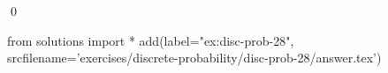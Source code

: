 
\begin{ex} 
  \label{ex:disc-prob-28}
  
  \qed
\end{ex} 
\begin{python0}
from solutions import *
add(label="ex:disc-prob-28",
    srcfilename='exercises/discrete-probability/disc-prob-28/answer.tex') 
\end{python0}
